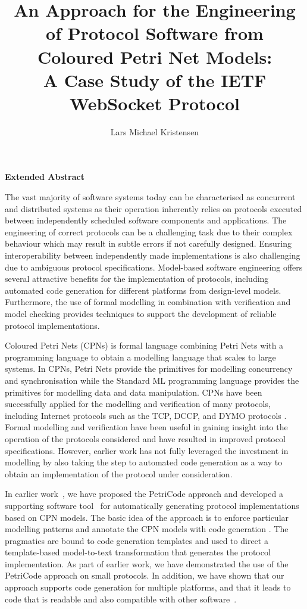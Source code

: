 \documentclass{llncs}
\title{An Approach for the Engineering of Protocol Software from Coloured Petri Net Models: \\ A Case Study of the IETF WebSocket Protocol}
\author{Lars Michael Kristensen}
\institute{Department of Computing, Bergen University College, Norway
\\
Email: \email{lmkr@hib.no} 
}
\begin{document}
  
\maketitle

\begin{center}
{\textbf{Extended Abstract}}
\end{center}

The vast majority of software systems today can be characterised as
concurrent and distributed systems as their operation inherently
relies on protocols executed between independently scheduled software
components and applications. The engineering of correct protocols can
be a challenging task due to their complex behaviour which may result
in subtle errors if not carefully designed. Ensuring
interoperability between independently made implementations is also
challenging due to ambiguous protocol specifications.  Model-based
software engineering offers several attractive benefits for the
implementation of protocols, including automated code generation for
different platforms from design-level models. Furthermore, the use of
formal modelling in combination with verification and model checking
provides techniques to support the development of reliable protocol
implementations.

Coloured Petri Nets (CPNs) \cite{CPNTOOLSPAPER} is formal language
combining Petri Nets with a programming language to obtain a modelling
language that scales to large systems. In CPNs, Petri Nets provide the
primitives for modelling concurrency and synchronisation while the
Standard ML programming language provides the primitives for modelling
data and data manipulation. CPNs have been successfully applied for
the modelling and verification of many protocols, including Internet
protocols such as the TCP, DCCP, and DYMO protocols
\cite{billington04,acpn2012}. Formal modelling and verification have
been useful in gaining insight into the operation of the protocols
considered and have resulted in improved protocol
specifications. However, earlier work has not fully leveraged the
investment in modelling by also taking the step to automated code
generation as a way to obtain an implementation of the protocol under
consideration.


In earlier work~\cite{SKK13-2}, we have proposed the PetriCode
approach and developed a supporting software
tool~\cite{petricodePaper} for automatically generating protocol
implementations based on CPN models.  The basic idea of the approach
is to enforce particular modelling patterns and annotate the CPN
models with code generation . The pragmatics are
bound to code generation templates and used to direct a template-based
model-to-text transformation that generates the protocol
implementation. As part of earlier work, we have demonstrated the use
of the PetriCode approach on small protocols. In addition, we have
shown that our approach supports code generation for multiple
platforms, and that it leads to code that is readable and also %
 compatible with other software~\cite{ecmfa14}.
\end{document}
